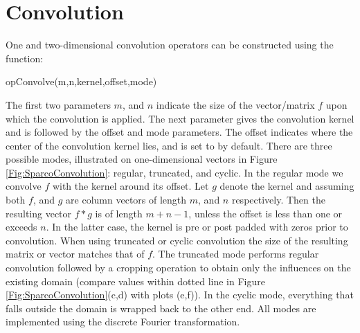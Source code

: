 \section{Convolution}
One and two-dimensional convolution operators can be constructed using
the  function:
\begin{codeblock}
opConvolve(m,n,kernel,offset,mode)
\end{codeblock}
The first two parameters $m$, and $n$ indicate the size of the
vector/matrix $f$ upon which the convolution is applied. The next
parameter gives the convolution kernel and is followed by the offset
and mode parameters.  The offset indicates where the center of the
convolution kernel lies, and is set to \mlcmd{[1,1]} by default.
There are three possible modes, illustrated on one-dimensional vectors
in Figure \ref{Fig:SparcoConvolution}: regular, truncated, and
cyclic. In the regular mode we convolve $f$ with the kernel around its
offset. Let $g$ denote the kernel and assuming both $f$, and $g$ are
column vectors of length $m$, and $n$ respectively. Then the resulting
vector $f*g$ is of length $m+n-1$, unless the offset is less than one
or exceeds $n$. In the latter case, the kernel is pre or post padded
with zeros prior to convolution. When using truncated or cyclic
convolution the size of the resulting matrix or vector matches that of
$f$. The truncated mode performs regular convolution followed by a
cropping operation to obtain only the influences on the existing
domain (compare values within dotted line in Figure
\ref{Fig:SparcoConvolution}(c,d) with plots (e,f)). In the cyclic
mode, everything that falls outside the domain is wrapped back to the
other end. All modes are implemented using the discrete Fourier
transformation.

